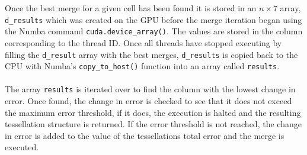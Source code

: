 Once the best merge for a given cell has been found it is stored in an $n \times 7$ array, \texttt{d\_results} which was created on the GPU before the merge iteration began using the Numba command \texttt{cuda.device\_array()}. The values are stored in the column corresponding to the thread ID. Once all threads have stopped executing by filling the \texttt{d\_result} array with the best merges, \texttt{d\_results} is copied back to the CPU with Numba's \texttt{copy\_to\_host()} function into an array called \texttt{results}.
\\
\\
The array \texttt{results} is iterated over to find the column with the lowest change in error. Once found, the change in error is checked to see that it does not exceed the maximum error threshold, if it does, the execution is halted and the resulting tessellation structure is returned. If the error threshold is not reached, the change in error is added to the value of the tessellations total error and the merge is executed.